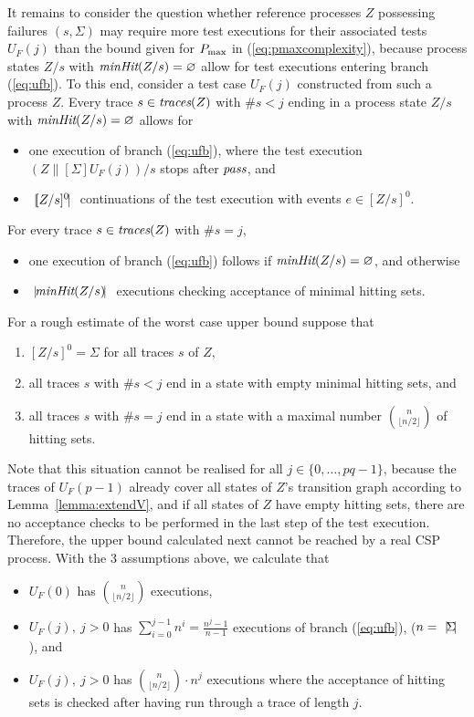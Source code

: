 It remains to
consider the question whether reference processes $Z$ possessing failures $(s,\Sigma)$
may require more test executions for their associated tests $U_F(j)$ than the bound
given for $P_\text{max}$ in (\ref{eq:pmaxcomplexity}), because process states $Z/s$ with
$\text{\it minHit}(Z/s)=\varnothing$ allow for test executions entering branch (\ref{eq:ufb}).
To this end, consider a test case $U_F(j)$ constructed from such a process $Z$. Every trace
$s\in\text{\it traces}(Z)$ with $\#s<j$ ending in a process state $Z/s$ with $\text{\it minHit}(Z/s)=\varnothing$ allows for
%
\begin{itemize}
\item one execution of branch (\ref{eq:ufb}), where the test execution
$(Z\parallel[\Sigma]U_F(j))/s$ stops after ${\text{\it pass}}$, and
\item ${~|\! [Z/s]^0\!|~}$   continuations of the test execution with events $e\in [Z/s]^0$.
\end{itemize}
%
For every trace $s\in\text{\it traces}(Z)$ with $\#s=j$,
%
\begin{itemize}
\item one execution of branch (\ref{eq:ufb}) follows if
$\text{\it minHit}(Z/s)=\varnothing$, and otherwise
\item ${~|\! \text{\it minHit}(Z/s)\!|~}$ executions checking acceptance of minimal hitting sets.
\end{itemize}
%
For a rough estimate of the worst case upper bound suppose that
%
\begin{enumerate}
\item $[Z/s]^0 = \Sigma$ for all traces $s$ of $Z$,
\item all traces $s$ with $\#s<j$ end in a state with empty minimal hitting sets, and
\item all traces $s$ with $\#s=j$ end in a state with a maximal number $\binom{n}{\lfloor n/2\rfloor}$
 of hitting sets.
\end{enumerate}
%
Note that this situation cannot be realised for all $j\in\{0,\dots,pq-1\}$, because
the traces of
$U_F(p-1)$ already cover all states of $Z$'s transition graph according to Lemma~\ref{lemma:extendV}, and if all states of $Z$ have empty hitting sets, there are no acceptance checks to be performed in the last step of the test execution. Therefore, the   upper bound calculated next cannot be reached by a real CSP process.
With the 3 assumptions above, we calculate that
%
\begin{itemize}
\item  $U_F(0)$ has  $\binom{n}{\lfloor n/2\rfloor}$ executions,
\item $U_F(j),\ j > 0$ has $\sum_{i=0}^{j-1} n^i = \frac{n^j - 1}{n-1}$ executions of branch (\ref{eq:ufb}), ($n = {~|\! \Sigma\!|~}$), and
\item $U_F(j),\ j > 0$ has $\binom{n}{\lfloor n/2\rfloor}\cdot n^j$ executions where the acceptance of
hitting sets is checked after having run through a trace of length $j$.
\end{itemize}
